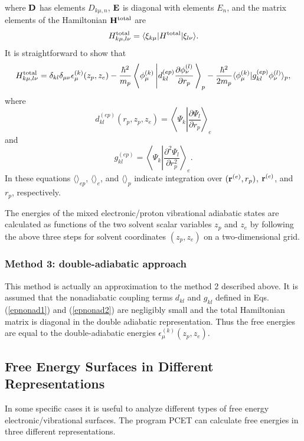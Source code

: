 \documentclass[oneside,11pt,openany]{book}
\begin{document}
where ${\bf D}$ has elements $D_{k\mu,n}$, ${\bf E}$ is diagonal with
elements $E_{n}$, and
the matrix elements of the Hamiltonian ${\bf H}^{\rm total}$ are
\begin{equation}
H_{k\mu,l\nu}^{\rm total} = \langle \xi_{k\mu}|H^{\rm total}|\xi_{l\nu}\rangle.
\end{equation}
It is straightforward to show that
\begin{equation}
H_{k\mu,l\nu}^{\rm total} =
\delta_{kl}\delta_{\mu\nu}\epsilon_\mu^{(k)}(z_p,z_e)
- \frac{\hbar^2}{m_p}\left\langle \phi_\mu^{(k)}\left|
d_{kl}^{(ep)} \frac{\partial \phi_\nu^{(l)}}{\partial r_p} 
\right.\right\rangle_p
- \frac{\hbar^2}{2m_p}\langle \phi_\mu^{(k)}|
g_{kl}^{(ep)}\phi_\nu^{(l)} \rangle_p,
\label{eq.hinjm}
\end{equation}
where
\begin{equation}
d_{kl}^{(ep)}(r_p,z_p,z_e)
=\left\langle \Psi_k \left| \frac{\partial \Psi_l}{\partial r_p} 
\right.\right\rangle_e
\label{epnonad1}
\end{equation}
and
\begin{equation}
g_{kl}^{(ep)}=\left\langle \Psi_k\left|\frac{\partial^2 \Psi_l}{\partial r_p^2}
\right.\right\rangle_e.
\label{epnonad2}
\end{equation} 
In these
equations $\langle \rangle_{ep}$, $\langle \rangle_e$, and $\langle \rangle_p$
indicate integration over $({\bf r}^{(e)}, r_p)$, ${\bf r}^{(e)}$, and
$r_p$, respectively.
\par
The energies of the mixed electronic/proton vibrational
adiabatic states are calculated
as functions of the two solvent scalar variables $z_p$ and $z_e$
by following the above three steps for solvent coordinates $(z_p,z_e)$
on a two-dimensional grid.

\subsubsection{Method 3: double-adiabatic approach}
This method is actually an approximation to the method 2
described above. It is assumed that the nonadiabatic coupling
terms $d_{kl}$ and $g_{kl}$ defined in Eqs.(\ref{epnonad1})
and (\ref{epnonad2}) are negligibly small and the total Hamiltonian
matrix is diagonal in the double adiabatic representation.
Thus the free energies are equal to the double-adiabatic
energies $\epsilon_\mu^{(k)}(z_p,z_e)$.

\subsection{Free Energy Surfaces in Different Representations}
In some specific cases it is useful to analyze different
types of free energy electronic/vibrational surfaces.
The program PCET can calculate free energies in three different
representations.
\end{document}
